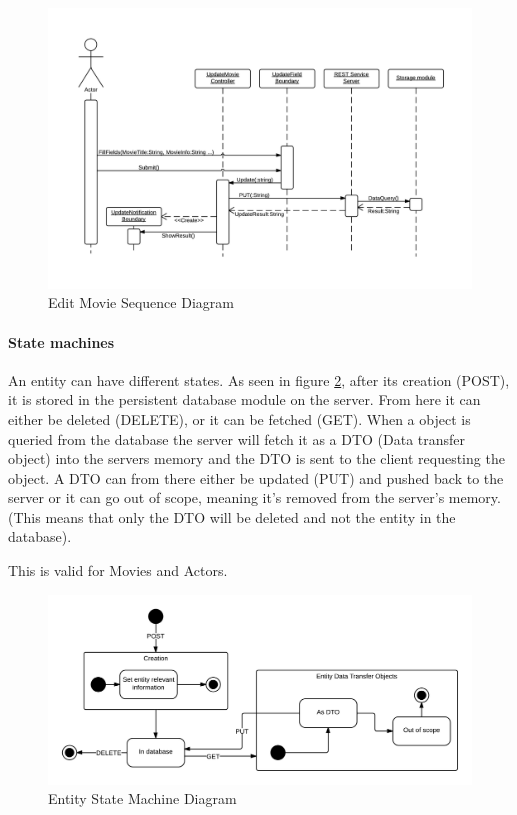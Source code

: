 \begin{figure}[H]
\includegraphics[width=\linewidth]{img/RAD/EditMovieSequenceDiagram.png}
\caption{Edit Movie Sequence Diagram}
\label{fig:Edit Movie Sequence Diagram}
\end{figure}

\paragraph{State machines}
An entity can have different states. As seen in figure \ref{fig:Entity State Machine Diagram}, after its creation (POST), it is stored in the persistent database module on the server. From here it can either be deleted (DELETE), or it can be fetched (GET). When a object is queried from the database the server will fetch it as a DTO (Data transfer object) into the servers memory and the DTO is sent to the client requesting the object. A DTO can from there either be updated (PUT) and pushed back to the server or it can go out of scope, meaning it's removed from the server's memory. (This means that only the DTO will be deleted and not the entity in the database).

This is valid for Movies and Actors.

\begin{figure}[H]
\includegraphics[width=\linewidth]{img/RAD/EntityStateMachineDiagram.png}
\caption{Entity State Machine Diagram}
\label{fig:Entity State Machine Diagram}
\end{figure}

